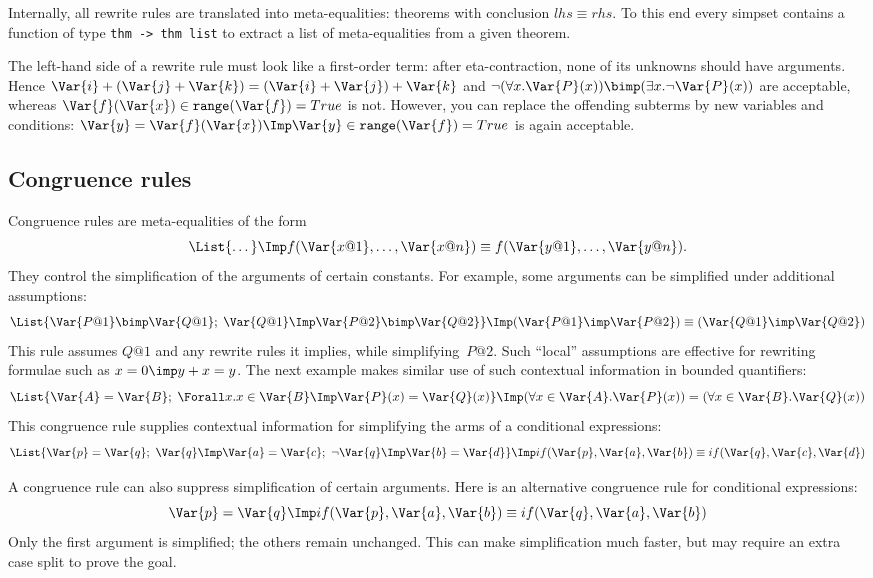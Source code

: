 Internally, all rewrite rules are translated into meta-equalities:
theorems with conclusion $lhs \equiv rhs$.  To this end every simpset contains
a function of type \verb$thm -> thm list$ to extract a list
of meta-equalities from a given theorem.

\begin{warn}
  The left-hand side of a rewrite rule must look like a first-order term:
  after eta-contraction, none of its unknowns should have arguments.  Hence
  ${\Var{i}+(\Var{j}+\Var{k})} = {(\Var{i}+\Var{j})+\Var{k}}$ and $\neg(\forall
  x.\Var{P}(x)) \bimp (\exists x.\neg\Var{P}(x))$ are acceptable, whereas
  $\Var{f}(\Var{x})\in {\tt range}(\Var{f}) = True$ is not.  However, you can
  replace the offending subterms by new variables and conditions: $\Var{y} =
  \Var{f}(\Var{x}) \Imp \Var{y}\in {\tt range}(\Var{f}) = True$ is again
  acceptable.
\end{warn}

\subsection {Congruence rules}
Congruence rules are meta-equalities of the form
\[ \List{\dots} \Imp
   f(\Var{x@1},\ldots,\Var{x@n}) \equiv f(\Var{y@1},\ldots,\Var{y@n}).
\]
They control the simplification of the arguments of certain constants.  For
example, some arguments can be simplified under additional assumptions:
\[ \List{\Var{P@1} \bimp \Var{Q@1};\; \Var{Q@1} \Imp \Var{P@2} \bimp \Var{Q@2}}
   \Imp (\Var{P@1} \imp \Var{P@2}) \equiv (\Var{Q@1} \imp \Var{Q@2})
\]
This rule assumes $Q@1$ and any rewrite rules it implies, while
simplifying~$P@2$.  Such ``local'' assumptions are effective for rewriting
formulae such as $x=0\imp y+x=y$.  The next example makes similar use of
such contextual information in bounded quantifiers:
\[ \List{\Var{A}=\Var{B};\; \Forall x. x\in \Var{B} \Imp \Var{P}(x) = \Var{Q}(x)}
   \Imp (\forall x\in \Var{A}.\Var{P}(x)) = (\forall x\in \Var{B}.\Var{Q}(x))
\]
This congruence rule supplies contextual information for simplifying the
arms of a conditional expressions:
\[ \List{\Var{p}=\Var{q};~ \Var{q} \Imp \Var{a}=\Var{c};~
         \neg\Var{q} \Imp \Var{b}=\Var{d}} \Imp
   if(\Var{p},\Var{a},\Var{b}) \equiv if(\Var{q},\Var{c},\Var{d})
\]

A congruence rule can also suppress simplification of certain arguments.
Here is an alternative congruence rule for conditional expressions:
\[ \Var{p}=\Var{q} \Imp
   if(\Var{p},\Var{a},\Var{b}) \equiv if(\Var{q},\Var{a},\Var{b})
\]
Only the first argument is simplified; the others remain unchanged.
This can make simplification much faster, but may require an extra case split
to prove the goal.  

